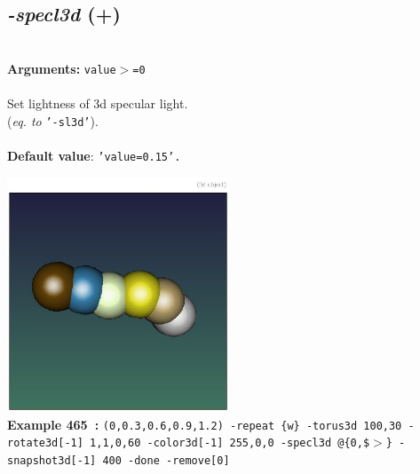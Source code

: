 \documentclass[a4paper,11pt,twoside]{book}
\begin{document}
\subsection{\emph{-specl3d} (+)}\vspace*{-0.5em}
~\\\textbf{Arguments: } 
{\small \texttt{value$>$=0}}\\~\\
Set lightness of 3d specular light.
~\\(\emph{eq. to} {\small \texttt{'-sl3d'}}).
~\\~\\\textbf{Default value}: {\small \texttt{'value=0.15'.}}
\begin{center}\includegraphics[keepaspectratio=true,height=7cm,width=\textwidth]{img/gmic_def465.jpg}\\
{\footnotesize \textbf{Example 465~:} \texttt{(0,0.3,0.6,0.9,1.2) -repeat \{w\} -torus3d 100,30 -rotate3d[-1] 1,1,0,60 -color3d[-1] 255,0,0 -specl3d @\{0,\$$>$\} -snapshot3d[-1] 400 -done -remove[0]}}
\end{center}
\end{document}
